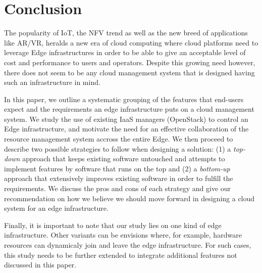 
\section{Conclusion}
\label{sec:conclusion}

The popularity of IoT, the NFV trend as well as the new breed of applications
like AR/VR, heralds a new era of cloud computing where cloud
platforms need to leverage Edge infrastructures in order to be able to
give an acceptable level of cost and performance to users and
operators.  Despite this growing need however, there does not seem to
be any cloud management system that is designed having such an
infrastructure in mind. 

In this paper, we outline a systematic
grouping of the features that end-users expect and the requirements an
edge infrastructure puts on a cloud management system. 
We study the use of existing IaaS managers (\ie OpenStack) to control an Edge infrastructure, and motivate the need for an  effective collaboration of the resource management system accross the entire Edge.
We then proceed to describe two possible strategies to follow when designing a solution: (1) a
\emph{top-down} approach that keeps existing software untouched and
attempts to implement features by software that runs on the top and (2)
a \emph{bottom-up} approach that extensively improves existing
software in order to fulfill the requirements. We discuss the pros and
cons of each strategy and give our recommendation on how we believe we
should move forward in designing a cloud system for an edge
infrastructure.

Finally, it is important to note that our study lies on one kind of edge infrastructure. Other variants can be envisions where, for example, hardware resources can dynamicaly join and leave the edge infrastructure. For such cases, this study needs to be further extended to integrate additional features not discussed in this paper.

